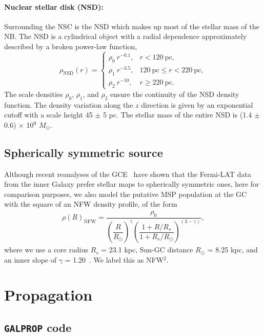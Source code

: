 \documentclass[doublespace,draft,nopageskip]{VTthesis} %
\begin{document}
\paragraph{Nuclear stellar disk (NSD):} Surrounding the NSC is the NSD which makes up most of the stellar mass of the NB. The NSD is a cylindrical object with a radial dependence approximately described by a broken power-law function,
\begin{equation}\label{eq:rhonsd}
  \rho_{\text{NSD}}(r) = \begin{cases}
    \rho_0\ r^{-0.1}, & r < 120\ \text{pc},\\
    \rho_1\ r^{-3.5}, & 120\ \text{pc} \leq r < 220\ \text{pc},\\
    \rho_2\ r^{-10}, & r \geq 220\ \text{pc}.
  \end{cases}
\end{equation}
The scale densities $\rho_0$, $\rho_1$, and $\rho_2$ ensure the continuity of the NSD density function. The density variation along the $z$ direction is given by an exponential cutoff with a scale height 45 $\pm$ 5 pc. The stellar mass of the entire NSD is (1.4 $\pm$ 0.6) $\times$ 10$^9$ $M_\odot$.

\subsection{Spherically symmetric source}\label{sec:NFW}

Although recent reanalyses of the GCE~\cite{Macias:2016nev,Bartels:2017vsx} have shown that the Fermi-LAT data from the inner Galaxy prefer stellar maps to spherically symmetric ones, here for comparison purposes, we also model the putative MSP population at the GC with the square of an NFW density profile, of the form
\begin{eqnarray}\label{eq:NFW}
  \rho(R)_{\text{NFW}} = \dfrac{\rho_0}{\left(\dfrac{R}{R_\odot}\right)^\gamma\left(\dfrac{1+R/R_s}{1+R_s/R_\odot}\right)^{(3-\gamma)}},
\end{eqnarray}
where we use a core radius $R_s$ = 23.1 kpc, Sun-GC distance $R_\odot$ = 8.25 kpc, and an inner slope of $\gamma$ = 1.20~\cite{Abazajian:2012pn,Macias:2013vya}. We label this as NFW$^2$.

\section{Propagation}\label{sec:prop}

\subsection{\texttt{GALPROP} code}\label{sec:galprop}
\end{document}

